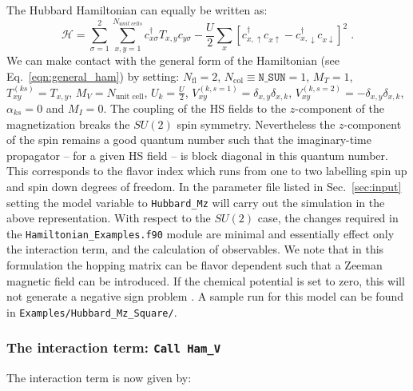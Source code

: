 The Hubbard Hamiltonian can equally be written as:
\begin{equation}
\label{eqn_hubbard_Mz}
\mathcal{H}=
\sum\limits_{\sigma=1}^{2} 
\sum\limits_{x,y =1 }^{N_{unit\; cells }} 
  c^{\dagger}_{x \sigma} T_{x,y}c^{\phantom\dagger}_{y \sigma} 
- \frac{U}{2}\sum\limits_{x}\left[
c^{\dagger}_{x, \uparrow} c^{\phantom\dagger}_{x \uparrow}  -   c^{\dagger}_{x, \downarrow} c^{\phantom\dagger}_{x \downarrow}  \right]^{2}\;.
\end{equation} 
We can make contact with the general form of the Hamiltonian  (see Eq.~\ref{eqn:general_ham}) by setting: 
$N_{\mathrm{fl}} = 2$, $N_{\mathrm{col}} \equiv \texttt{N\_SUN}     =1 $,   $M_T    =    1$,  $T^{(ks)}_{x y}   =  T_{x,y}$,  $M_V   =  N_{\text{unit cell}} $,  $U_{k}       =   \frac{U}{2}$, 
 $V_{x y}^{(k, s=1)} =  \delta_{x,y} \delta_{x,k}  $,  $V_{x y}^{(k, s=2)} =  - \delta_{x,y} \delta_{x,k}  $,  $\alpha_{ks}   = 0  $ and $M_I       = 0 $.   
 The coupling of the HS fields to the $z$-component of   the magnetization breaks the $SU(2)$ spin symmetry. Nevertheless the $z$-component of the spin remains a good quantum number such that the imaginary-time propagator -- for a given HS field -- is block  diagonal in this quantum number. This corresponds to the flavor index  which runs from one to two  labelling spin up and spin down  degrees of freedom.       In the parameter file  listed in  Sec.~\ref{sec:input}  setting the model variable to  \texttt{Hubbard\_Mz}  will carry out the simulation in the above representation. 
 With respect to the $SU(2)$ case, the changes required in the \texttt{Hamiltonian\_Examples.f90}   module are  minimal and essentially effect only the interaction term, and the calculation of observables.  We note that  in this formulation the  hopping matrix can be flavor dependent such that a Zeeman  magnetic field can be introduced.  If the chemical potential is set to zero, this will not generate a negative sign problem \cite{Wu04,Milat04,Bercx09}.    
 A sample run for this model can be found in \texttt{Examples/Hubbard\_Mz\_Square/}.

\subsubsection{The interaction term: \texttt{Call Ham\_V} } 
The interaction term is now given by: 


